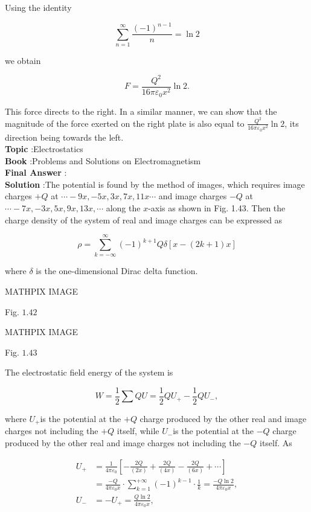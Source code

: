 \documentclass[10pt]{article}
\begin{document}
Using the identity

$$
\sum_{n=1}^{\infty} \frac{(-1)^{n-1}}{n}=\ln 2
$$

we obtain

$$
F=\frac{Q^{2}}{16 \pi \varepsilon_{0} x^{2}} \ln 2 .
$$

This force directs to the right. In a similar manner, we can show that the magnitude of the force exerted on the right plate is also equal to $\frac{Q^{2}}{16 \pi \varepsilon_{0} x^{2}} \ln 2$, its direction being towards the left.
\\
\textbf{Topic} :Electrostatics\\
\textbf{Book} :Problems and Solutions on Electromagnetism\\
\textbf{Final Answer} : \\


\textbf{Solution} :The potential is found by the method of images, which requires image charges $+Q$ at $\cdots-9 x,-5 x, 3 x, 7 x, 11 x \cdots$ and image charges $-Q$ at $\cdots-7 x,-3 x, 5 x, 9 x, 13 x, \cdots$ along the $x$-axis as shown in Fig. 1.43. Then the charge density of the system of real and image charges can be expressed as

$$
\rho=\sum_{k=-\infty}^{\infty}(-1)^{k+1} Q \delta[x-(2 k+1) x]
$$

where $\delta$ is the one-dimensional Dirac delta function. 

MATHPIX IMAGE

Fig. $1.42$

MATHPIX IMAGE

Fig. $1.43$

The electrostatic field energy of the system is

$$
W=\frac{1}{2} \sum Q U=\frac{1}{2} Q U_{+}-\frac{1}{2} Q U_{-},
$$

where $U_{+}$is the potential at the $+Q$ charge produced by the other real and image charges not including the $+Q$ itself, while $U_{-}$is the potential at the $-Q$ charge produced by the other real and image charges not including the $-Q$ itself. As

$$
\begin{aligned}
U_{+} &=\frac{1}{4 \pi \varepsilon_{0}}\left[-\frac{2 Q}{(2 x)}+\frac{2 Q}{(4 x)}-\frac{2 Q}{(6 x)}+\cdots\right] \\
&=\frac{-Q}{4 \pi \varepsilon_{0} x} \cdot \sum_{k=1}^{+\infty}(-1)^{k-1} \cdot \frac{1}{k}=\frac{-Q \ln 2}{4 \pi \varepsilon_{0} x}, \\
U_{-} &=-U_{+}=\frac{Q \ln 2}{4 \pi \varepsilon_{0} x},
\end{aligned}
$$
\end{document}
